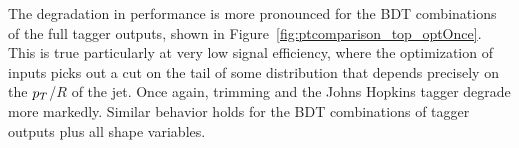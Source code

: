 The degradation in performance is more pronounced for the BDT combinations of the full tagger outputs, shown in Figure~\ref{fig:ptcomparison_top_optOnce}. This is true particularly at very low signal efficiency, where the optimization of inputs picks out a cut on the tail of some distribution that depends precisely on the $p_T$/$R$ of the jet. Once again, trimming and the Johns Hopkins tagger degrade more markedly.  Similar behavior holds for the BDT combinations of tagger outputs plus all shape variables.\\

\begin{figure}
\centering
{}

\end{figure}
